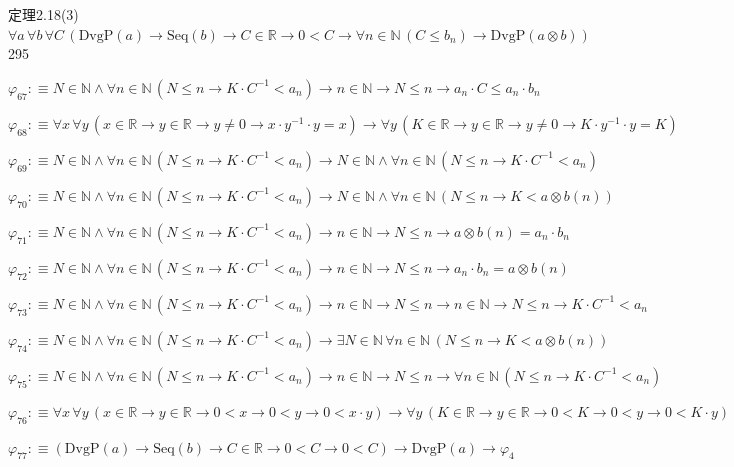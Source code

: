 \begin{fullproof}{定理2.18(3)}{$\forall a\,\forall b\,\forall C\,(\mathrm{DvgP}(a) \to \mathrm{Seq}(b) \to C \in \mathbb{R} \to 0 < C \to \forall n \in \mathbb{N}\,(C \leq b_{n}) \to \mathrm{DvgP}(a \otimes b))$}{295}
\begin{abbrevlist}
\item $\varphi_{67} :\equiv N \in \mathbb{N} \land \forall n \in \mathbb{N}\,(N \leq n \to K \cdot C^{-1} < a_{n}) \to n \in \mathbb{N} \to N \leq n \to a_{n} \cdot C \leq a_{n} \cdot b_{n}$
\item $\varphi_{68} :\equiv \forall x\,\forall y\,(x \in \mathbb{R} \to y \in \mathbb{R} \to y \neq 0 \to x \cdot y^{-1} \cdot y = x) \to \forall y\,(K \in \mathbb{R} \to y \in \mathbb{R} \to y \neq 0 \to K \cdot y^{-1} \cdot y = K)$
\item $\varphi_{69} :\equiv N \in \mathbb{N} \land \forall n \in \mathbb{N}\,(N \leq n \to K \cdot C^{-1} < a_{n}) \to N \in \mathbb{N} \land \forall n \in \mathbb{N}\,(N \leq n \to K \cdot C^{-1} < a_{n})$
\item $\varphi_{70} :\equiv N \in \mathbb{N} \land \forall n \in \mathbb{N}\,(N \leq n \to K \cdot C^{-1} < a_{n}) \to N \in \mathbb{N} \land \forall n \in \mathbb{N}\,(N \leq n \to K < a \otimes b(n))$
\item $\varphi_{71} :\equiv N \in \mathbb{N} \land \forall n \in \mathbb{N}\,(N \leq n \to K \cdot C^{-1} < a_{n}) \to n \in \mathbb{N} \to N \leq n \to a \otimes b(n) = a_{n} \cdot b_{n}$
\item $\varphi_{72} :\equiv N \in \mathbb{N} \land \forall n \in \mathbb{N}\,(N \leq n \to K \cdot C^{-1} < a_{n}) \to n \in \mathbb{N} \to N \leq n \to a_{n} \cdot b_{n} = a \otimes b(n)$
\item $\varphi_{73} :\equiv N \in \mathbb{N} \land \forall n \in \mathbb{N}\,(N \leq n \to K \cdot C^{-1} < a_{n}) \to n \in \mathbb{N} \to N \leq n \to n \in \mathbb{N} \to N \leq n \to K \cdot C^{-1} < a_{n}$
\item $\varphi_{74} :\equiv N \in \mathbb{N} \land \forall n \in \mathbb{N}\,(N \leq n \to K \cdot C^{-1} < a_{n}) \to \exists N \in \mathbb{N}\,\forall n \in \mathbb{N}\,(N \leq n \to K < a \otimes b(n))$
\item $\varphi_{75} :\equiv N \in \mathbb{N} \land \forall n \in \mathbb{N}\,(N \leq n \to K \cdot C^{-1} < a_{n}) \to n \in \mathbb{N} \to N \leq n \to \forall n \in \mathbb{N}\,(N \leq n \to K \cdot C^{-1} < a_{n})$
\item $\varphi_{76} :\equiv \forall x\,\forall y\,(x \in \mathbb{R} \to y \in \mathbb{R} \to 0 < x \to 0 < y \to 0 < x \cdot y) \to \forall y\,(K \in \mathbb{R} \to y \in \mathbb{R} \to 0 < K \to 0 < y \to 0 < K \cdot y)$
\item $\varphi_{77} :\equiv (\mathrm{DvgP}(a) \to \mathrm{Seq}(b) \to C \in \mathbb{R} \to 0 < C \to 0 < C) \to \mathrm{DvgP}(a) \to \varphi_{4}$

\end{abbrevlist}
\end{fullproof}
